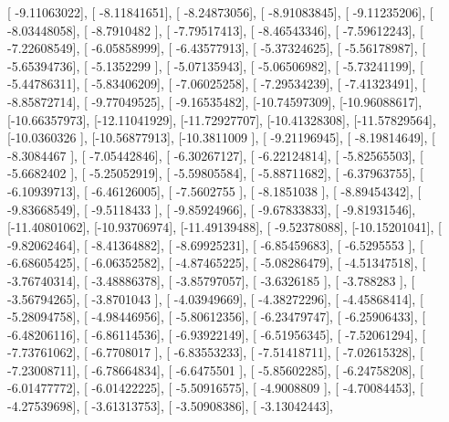 \documentclass{article}
\begin{document}
       [ -9.11063022],
       [ -8.11841651],
       [ -8.24873056],
       [ -8.91083845],
       [ -9.11235206],
       [ -8.03448058],
       [ -8.7910482 ],
       [ -7.79517413],
       [ -8.46543346],
       [ -7.59612243],
       [ -7.22608549],
       [ -6.05858999],
       [ -6.43577913],
       [ -5.37324625],
       [ -5.56178987],
       [ -5.65394736],
       [ -5.1352299 ],
       [ -5.07135943],
       [ -5.06506982],
       [ -5.73241199],
       [ -5.44786311],
       [ -5.83406209],
       [ -7.06025258],
       [ -7.29534239],
       [ -7.41323491],
       [ -8.85872714],
       [ -9.77049525],
       [ -9.16535482],
       [-10.74597309],
       [-10.96088617],
       [-10.66357973],
       [-12.11041929],
       [-11.72927707],
       [-10.41328308],
       [-11.57829564],
       [-10.0360326 ],
       [-10.56877913],
       [-10.3811009 ],
       [ -9.21196945],
       [ -8.19814649],
       [ -8.3084467 ],
       [ -7.05442846],
       [ -6.30267127],
       [ -6.22124814],
       [ -5.82565503],
       [ -5.6682402 ],
       [ -5.25052919],
       [ -5.59805584],
       [ -5.88711682],
       [ -6.37963755],
       [ -6.10939713],
       [ -6.46126005],
       [ -7.5602755 ],
       [ -8.1851038 ],
       [ -8.89454342],
       [ -9.83668549],
       [ -9.5118433 ],
       [ -9.85924966],
       [ -9.67833833],
       [ -9.81931546],
       [-11.40801062],
       [-10.93706974],
       [-11.49139488],
       [ -9.52378088],
       [-10.15201041],
       [ -9.82062464],
       [ -8.41364882],
       [ -8.69925231],
       [ -6.85459683],
       [ -6.5295553 ],
       [ -6.68605425],
       [ -6.06352582],
       [ -4.87465225],
       [ -5.08286479],
       [ -4.51347518],
       [ -3.76740314],
       [ -3.48886378],
       [ -3.85797057],
       [ -3.6326185 ],
       [ -3.788283  ],
       [ -3.56794265],
       [ -3.8701043 ],
       [ -4.03949669],
       [ -4.38272296],
       [ -4.45868414],
       [ -5.28094758],
       [ -4.98446956],
       [ -5.80612356],
       [ -6.23479747],
       [ -6.25906433],
       [ -6.48206116],
       [ -6.86114536],
       [ -6.93922149],
       [ -6.51956345],
       [ -7.52061294],
       [ -7.73761062],
       [ -6.7708017 ],
       [ -6.83553233],
       [ -7.51418711],
       [ -7.02615328],
       [ -7.23008711],
       [ -6.78664834],
       [ -6.6475501 ],
       [ -5.85602285],
       [ -6.24758208],
       [ -6.01477772],
       [ -6.01422225],
       [ -5.50916575],
       [ -4.9008809 ],
       [ -4.70084453],
       [ -4.27539698],
       [ -3.61313753],
       [ -3.50908386],
       [ -3.13042443],
\end{document}
